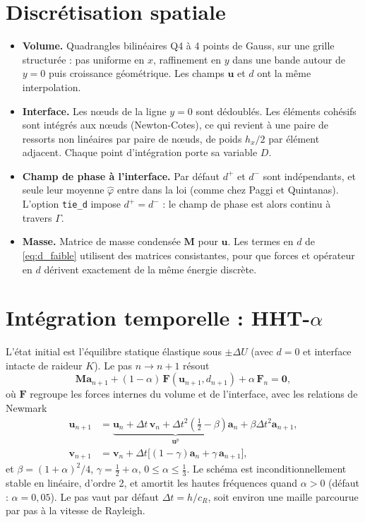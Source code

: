\documentclass[11pt,a4paper]{article}
\newcommand{\bu}{\bm{u}}\newcommand{\bq}{\bm{q}}\newcommand{\bt}{\bm{t}}
\newcommand{\phib}{\hat\varphi}
\begin{document}
\section{Discrétisation spatiale}
\begin{itemize}
\item \textbf{Volume.} Quadrangles bilinéaires Q4 à 4 points de Gauss, sur une grille structurée : pas
uniforme en $x$, raffinement en $y$ dans une bande autour de $y=0$ puis croissance géométrique. Les champs
$\bu$ et $d$ ont la même interpolation.
\item \textbf{Interface.} Les nœuds de la ligne $y=0$ sont dédoublés. Les éléments cohésifs sont intégrés
aux nœuds (Newton-Cotes), ce qui revient à une paire de ressorts non linéaires par paire de nœuds, de
poids $h_x/2$ par élément adjacent. Chaque point d'intégration porte sa variable $D$.
\item \textbf{Champ de phase à l'interface.} Par défaut $d^+$ et $d^-$ sont indépendants, et seule
leur moyenne $\phib$ entre dans la loi (comme chez Paggi et Quintanas). L'option \texttt{tie\_d} impose
$d^+=d^-$ : le champ de phase est alors continu à travers $\Gamma$.
\item \textbf{Masse.} Matrice de masse condensée $\bm{M}$ pour $\bu$. Les termes en $d$ de
\eqref{eq:d_faible} utilisent des matrices consistantes, pour que forces et opérateur en $d$ dérivent
exactement de la même énergie discrète.
\end{itemize}

\section{Intégration temporelle : HHT-$\alpha$}
L'état initial est l'équilibre statique élastique sous $\pm\Delta U$ (avec $d=0$ et interface intacte de
raideur $K$). Le pas $n\to n+1$ résout
\begin{equation}
\bm{M}\bm{a}_{n+1}+(1-\alpha)\,\bm{F}(\bu_{n+1},d_{n+1})+\alpha\,\bm{F}_n=\bm{0},
\end{equation}
où $\bm{F}$ regroupe les forces internes du volume et de l'interface, avec les relations de Newmark
\begin{align}
\bu_{n+1}&=\underbrace{\bu_n+\Delta t\,\bm{v}_n+\Delta t^2(\tfrac12-\beta)\bm{a}_n}_{\bu^{p}}+\beta\Delta t^2\bm{a}_{n+1},\\
\bm{v}_{n+1}&=\bm{v}_n+\Delta t\big[(1-\gamma)\bm{a}_n+\gamma\,\bm{a}_{n+1}\big],
\end{align}
et $\beta=(1+\alpha)^2/4$, $\gamma=\tfrac12+\alpha$, $0\le\alpha\le\tfrac13$. Le schéma est
inconditionnellement stable en linéaire, d'ordre 2, et amortit les hautes fréquences quand $\alpha>0$
(défaut : $\alpha=0{,}05$). Le pas vaut par défaut $\Delta t = h/c_R$, soit environ une maille parcourue
par pas à la vitesse de Rayleigh.
\end{document}
